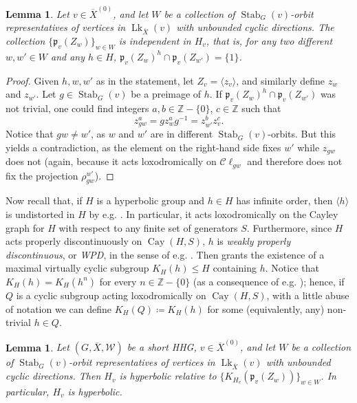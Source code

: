 \documentclass[svgnames]{amsart}
\theoremstyle{plain}
\newtheorem{lemma}[thm]{Lemma}
\theoremstyle{definition}
\newcommand{\Z}{\mathbb{Z}}
\newcommand{\Cay}[2]{\operatorname{Cay}\left(#1,#2\right)}
\newcommand{\C}{\mathcal C}
\newcommand{\ov}[1]{\overline{#1}}
\newcommand{\link}{\operatorname{Lk}}
\newcommand{\Stab}[2]{\operatorname{Stab}_{#1}(#2)}
\newcommand{\W}{\mathcal{W}}
\newcommand{\p}{\mathfrak{p}}
\begin{document}
\begin{lemma}\label{lem:malnormality}
    Let $v\in \ov{X}^{(0)}$, and let $W$ be a collection of $\Stab{G}{v}$-orbit representatives of vertices in $\link_{\ov X}(v)$ with unbounded cyclic directions. The collection $\{\p_v(Z_w)\}_{w\in W}$ is \emph{independent} in $H_v$, that is, for any two different $w,w'\in W$ and any $h\in H$, $\p_v(Z_w)^h\cap \p_v(Z_{w'})=\{1\}$.
\end{lemma}

\begin{proof}
    Given $h,w,w'$ as in the statement, let $Z_v=\langle z_v\rangle$, and similarly define $z_w$ and $z_{w'}$. Let $g\in \Stab{G}{v}$ be a preimage of $h$. If $\p_v(Z_w)^h\cap \p_v(Z_{w'})$ was not trivial, one could find integers $a,b\in \Z-\{0\}$, $c\in \Z$ such that $$z_{gw}^a=gz_w^ag^{-1}=z_{w'}^bz_v^c.$$
    Notice that $gw\neq w'$, as $w$ and $w'$ are in different $\Stab{G}{v}$-orbits. But this yields a contradiction, as the element on the right-hand side fixes $w'$ while $z_{gw}$ does not (again, because it acts loxodromically on $\C \ell_{gw}$ and therefore does not fix the projection $\rho^{w'}_{gw}$).
\end{proof}

Now recall that, if $H$ is a hyperbolic group and $h\in H$ has infinite order, then $\langle h\rangle$ is undistorted in $H$ by e.g. \cite[Corollary III.3.10]{bridsonhaefliger}. In particular, it acts loxodromically on the Cayley graph for $H$ with respect to any finite set of generators $S$. Furthermore, since $H$ acts properly discontinuously on $\Cay{H}{S}$, $h$ is \emph{weakly properly discontinuous}, or \emph{WPD}, in the sense of e.g. \cite{bestvina_fujiwara}.
Then \cite[Lemma 6.5]{DGO} grants the existence of a maximal virtually cyclic subgroup $K_H(h)\le H$ containing $h$. Notice that $K_H(h)=K_H(h^n)$ for every $n\in \Z-\{0\}$ (as a consequence of e.g. \cite[Corollary 6.6]{DGO}); hence, if $Q$ is a cyclic subgroup acting loxodromically on $\Cay{H}{S}$, with a little abuse of notation we can define $K_H(Q)\coloneq K_H(h)$ for some (equivalently, any) non-trivial $h\in Q$.

\begin{lemma}\label{lem:Hv_hyp_1}
    Let $(G, \ov X, \W)$ be a short HHG, $v\in \ov{X}^{(0)}$, and let $W$ be a collection of $\Stab{G}{v}$-orbit representatives of vertices in $\link_{\ov X}(v)$ with unbounded cyclic directions. Then $H_v$ is hyperbolic relative to $\{K_{H_v}(\p_v(Z_w))\}_{w\in W}$. In particular, $H_v$ is hyperbolic.
\end{lemma}
\end{document}
